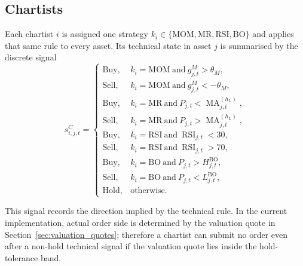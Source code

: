 \documentclass[12pt, a4paper]{article}
\DeclareMathOperator{\MA}{MA}
\DeclareMathOperator{\RSI}{RSI}
\begin{document}
    \subsection{Chartists}
    Each chartist \(i\) is assigned one strategy
    \(k_i\in\{\mathrm{MOM},\mathrm{MR},\mathrm{RSI},\mathrm{BO}\}\) and applies that
    same rule to every asset. Its technical state in asset \(j\) is
    summarised by the discrete signal
    \[
        s_{i,j,t}^{C}=
        \begin{cases}
            \mathrm{Buy}, & k_i=\mathrm{MOM}\ \text{and}\ g_{j,t}^M>\theta_M,\\
            \mathrm{Sell}, & k_i=\mathrm{MOM}\ \text{and}\ g_{j,t}^M<-\theta_M,\\
            \mathrm{Buy}, & k_i=\mathrm{MR}\ \text{and}\ P_{j,t}<\MA_{j,t}^{(h_L)},\\
            \mathrm{Sell}, & k_i=\mathrm{MR}\ \text{and}\ P_{j,t}>\MA_{j,t}^{(h_L)},\\
            \mathrm{Buy}, & k_i=\mathrm{RSI}\ \text{and}\ \RSI_{j,t}<30,\\
            \mathrm{Sell}, & k_i=\mathrm{RSI}\ \text{and}\ \RSI_{j,t}>70,\\
            \mathrm{Buy}, & k_i=\mathrm{BO}\ \text{and}\ P_{j,t}>H_{j,t}^{\mathrm{BO}},\\
            \mathrm{Sell}, & k_i=\mathrm{BO}\ \text{and}\ P_{j,t}<L_{j,t}^{\mathrm{BO}},\\
            \mathrm{Hold}, & \text{otherwise}.
        \end{cases}
    \]

    This signal records the direction implied by the technical rule. In the current
    implementation, actual order side is determined by the valuation quote in
    Section~\ref{sec:valuation_quotes}; therefore a chartist can submit no order
    even after a non-hold technical signal if the valuation quote lies inside the
    hold-tolerance band.
\end{document}
